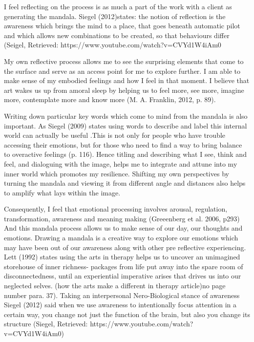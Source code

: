 I feel reflecting on the process is as much a part of the work with a client as generating the mandala. Siegel (2012)states: the notion of reflection is the awareness which brings the mind to a place, that goes beneath automatic pilot and which allows new combinations to be created, so that behaviours differ (Seigel, Retrieved: https://www.youtube.com/watch?v=CVYd1W4iAm0

My own reflective process allows me to see the surprising elements that come to the surface and serve as an access point for me to explore further. I am able to make sense of my embodied feelings and how I feel in that moment. I believe that art wakes us up from amoral sleep by helping us to feel more, see more, imagine more, contemplate more and know more (M. A. Franklin, 2012, p. 89). 

Writing down particular key words which come to mind from the mandala is also important. As Siegel (2009) states using words to describe and label this internal world can actually be useful .This is not only for people who have trouble accessing their emotions, but for those who need to find a way to bring balance to overactive feelings (p. 116). Hence titling and describing what I see, think and feel, and dialoguing with the image, helps me to integrate and attune into my inner world which promotes my resilience. Shifting my own perspectives by turning the mandala and viewing it from different angle and distances also helps to amplify what lays within the image. 

Consequently, I feel that emotional processing involves arousal, regulation, transformation, awareness and meaning making (Greeenberg et al. 2006, p293) And this mandala process allows us to make sense of our day, our thoughts and emotions. Drawing a mandala is a creative way to explore our emotions which may have been out of our awareness along with other pre reflective experiencing. Lett (1992) states using the arts in therapy helps us to uncover an unimagined storehouse of inner richness- packages from life put away into the spare room of disconnectedness, until an experiential imperative arises that drives us into our neglected selves. (how the arts make a different in therapy article)no page number para. 37). Taking an interpersonal Nero-Biological stance of awareness Siegel (2012) said when we use awareness to intentionally focus attention in a certain way, you change not just the function of the brain, but also you change its structure (Siegel, Retrieved: https://www.youtube.com/watch?v=CVYd1W4iAm0)



